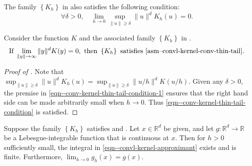 \begin{assumption}
\label{asm--convl-kernel-conv-thin-tail}
The family \(\left\{ K_{h} \right\}\) in
 also satisfies the following condition:
\begin{equation}
  \forall \delta > 0, \quad
  \lim_{h \to 0} \sup_{\|u\| \geq \delta} \|u\|^{d} K_{h} (u) = 0.
  \label{eqn--conv-kernel-thin-tail-condition}
\end{equation}
\end{assumption}

\begin{lemma}
\label{lem--convl-kernel-eg-thin-tail}
Consider the function \(K\) and the associated family \(\left\{ K_{h} \right\}\)
in .
\begin{equation}
  \text{If } \lim_{\|y\| \to \infty} \|y\|^{d} K (y) = 0, \text{ then } \left\{
  K_{h} \right\} \text{ satisfies \Cref{asm--convl-kernel-conv-thin-tail}.}
  \label{eqn--conv-kernel-thin-tail-condition-1}
\end{equation}
\end{lemma}

\begin{proof}[Proof of ]
Note that \(\sup_{\|u\| \geq \delta} \|u\|^{d} K_{h} (u) = \sup_{\|u\| \geq
\delta} \| u / h \|^{d} K (u / h)\).
Given any \(\delta > 0\), the premise in
\eqref{eqn--conv-kernel-thin-tail-condition-1} ensures that the right hand side
can be made arbitrarily small when \(h \to 0\).
Thus \eqref{eqn--conv-kernel-thin-tail-condition} is satisfied.
\end{proof}

\begin{theorem}
\label{thm--convl-kernel-conv-thin-tail}
Suppose the family \(\left\{ K_{h} \right\}\) satisfies
 and .
Let \(x \in \mathbb{R}^{d}\) be given, and let \(g : \mathbb{R}^{d} \to
\mathbb{R}\) be a Lebesgue-integrable function that is continuous at \(x\).
Then for \(h > 0\) sufficiently small, the integral in
\eqref{eqn--convl-kernel-approximant} exists and is finite.
Furthermore, \(\lim_{h \to 0} g_{h} (x) = g (x)\).
\end{theorem}

